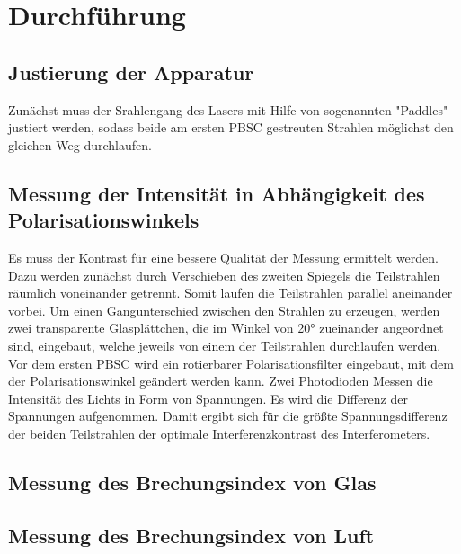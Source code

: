 \section{Durchführung}
\subsection{Justierung der Apparatur}
Zunächst muss der Srahlengang des Lasers mit Hilfe von sogenannten "Paddles" justiert werden,
sodass beide am ersten PBSC gestreuten Strahlen möglichst den gleichen Weg durchlaufen.

\subsection{Messung der Intensität in Abhängigkeit des Polarisationswinkels}
Es muss der Kontrast für eine bessere Qualität der Messung ermittelt werden.
Dazu werden zunächst durch Verschieben des zweiten Spiegels die Teilstrahlen räumlich voneinander getrennt.
Somit laufen die Teilstrahlen parallel aneinander vorbei.
Um einen Gangunterschied zwischen den Strahlen zu erzeugen,
werden zwei transparente Glasplättchen,
die im Winkel von 20° zueinander angeordnet sind,
eingebaut, welche jeweils von einem der Teilstrahlen durchlaufen werden.
Vor dem ersten PBSC wird ein rotierbarer Polarisationsfilter eingebaut,
mit dem der Polarisationswinkel geändert werden kann.
Zwei Photodioden Messen die Intensität des Lichts in Form von Spannungen.
Es wird die Differenz der Spannungen aufgenommen.
Damit ergibt sich für die größte Spannungsdifferenz der beiden Teilstrahlen der optimale Interferenzkontrast des Interferometers.


\subsection{Messung des Brechungsindex von Glas}

\subsection{Messung des Brechungsindex von Luft}
